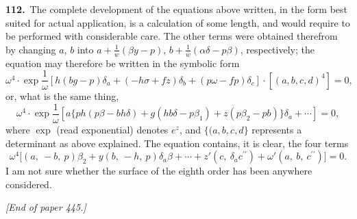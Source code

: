 \documentclass[11pt,a4paper]{article}
\begin{document}
\noindent\textbf{112.}\ The complete development of the equations above written, in the form best suited for actual application, is a calculation of some length, and would require to be performed with considerable care. The other terms were obtained therefrom by changing $a$, $b$ into $a + \frac{1}{w}(\beta y - p)$, $b + \frac{1}{w}(\alpha\delta - p\beta)$, respectively; the equation may therefore be written in the symbolic form
\[
\omega^4 \cdot \exp\frac{1}{\omega}\left[h(bg - p)\delta_a + (- h\sigma + fz)\delta_b + (p\omega - fp)\delta_c\right] \cdot [(a, b, c, d)^4] = 0,
\]
or, what is the same thing,
\[
\omega^4 \cdot \exp\frac{1}{\omega}\left[a\big\{ph(p\beta - bh\delta) + g(hb\delta - p\beta_1) + z(p\beta_2 - pb)\big\}\delta_a + \cdots\right] = 0,
\]
where $\exp$ (read exponential) denotes $e^z$, and $\{(a, b, c, d\}$ represents a determinant as above explained. The equation contains, it is clear, the four terms
\[
\omega^4\big[(a,\ -b,\ p)\beta_2 + y(b,\ -h,\ p)\delta_a\beta + \cdots + z'(c,\ \delta_a c^{\prime\prime}) + \omega'(a,\ b,\ c^{\prime\prime})\big] = 0.
\]
I am not sure whether the surface of the eighth order has been anywhere considered.

\medskip

\noindent\textit{[End of paper 445.]}
\end{document}
